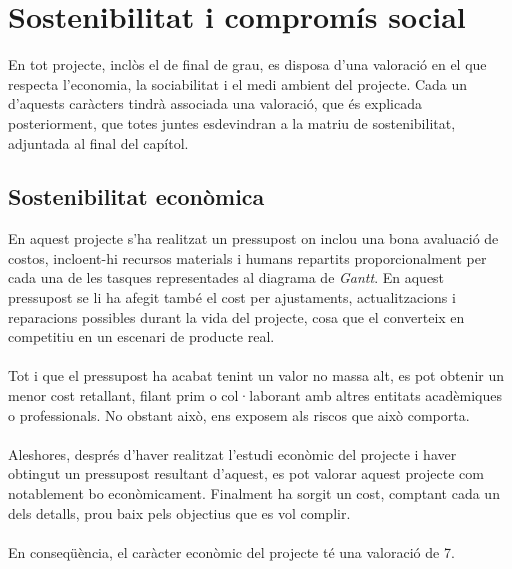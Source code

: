 
\chapter{Sostenibilitat i compromís social} %

\label{Chapter11} %

En tot projecte, inclòs el de final de grau, es disposa d'una valoració en el que respecta l'economia, la sociabilitat i el medi ambient del projecte. Cada un d'aquests caràcters tindrà associada una valoració, que és explicada posteriorment, que totes juntes esdevindran a la matriu de sostenibilitat\cite{impacto}, adjuntada al final del capítol.


\section{Sostenibilitat econòmica}

En aquest projecte s'ha realitzat un pressupost on inclou una bona avaluació de costos, incloent-hi recursos materials i humans repartits proporcionalment per cada una de les tasques representades al diagrama de \textit{Gantt}. En aquest pressupost se li ha afegit també el cost per ajustaments, actualitzacions i reparacions possibles durant la vida del projecte, cosa que el converteix en competitiu en un escenari de producte real.
\\\\
Tot i que el pressupost ha acabat tenint un valor no massa alt, es pot obtenir un menor cost retallant, filant prim o col·laborant amb altres entitats acadèmiques o professionals. No obstant això, ens exposem als riscos que això comporta. 
\\\\
Aleshores, després d'haver realitzat l'estudi econòmic del projecte i haver obtingut un pressupost resultant d'aquest, es pot valorar aquest projecte com notablement bo econòmicament. Finalment ha sorgit un cost, comptant cada un dels detalls, prou baix pels objectius que es vol complir.
\\\\
En conseqüència, el caràcter econòmic del projecte té una valoració de 7.

